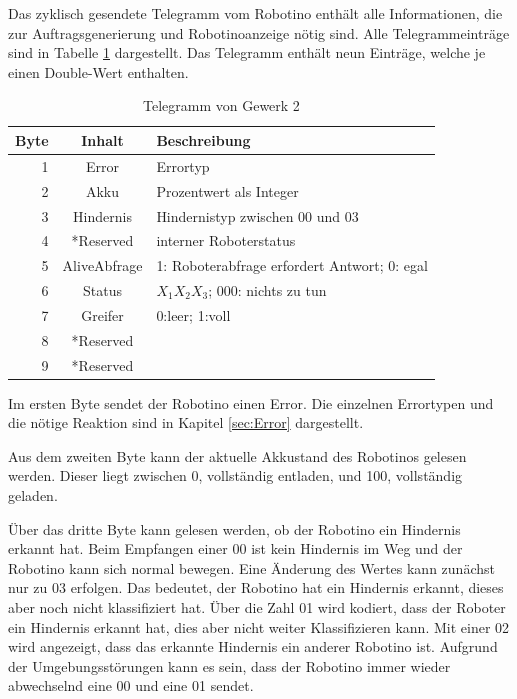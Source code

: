 Das zyklisch gesendete Telegramm vom Robotino enthält alle Informationen, die zur Auftragsgenerierung und Robotinoanzeige nötig sind. Alle Telegrammeinträge sind in Tabelle \ref{tab:TelegrammVonG2} dargestellt. Das Telegramm enthält neun Einträge, welche je einen Double-Wert enthalten. 

\begin{table}[!ht]
	\centering
	\begin{tabular}{|r|c|l|}
		\hline
		Byte & Inhalt	&	Beschreibung \\
		\hline
			1  & Error &  Errortyp  \\
			2  & Akku  & Prozentwert als Integer \\
			3  & Hindernis & Hindernistyp zwischen 00 und 03\\
		  4  & *Reserved &  interner Roboterstatus \\
		  5  & AliveAbfrage  & 1: Roboterabfrage erfordert Antwort; 0: egal \\
		  6  & Status & $X_1X_2X_3$; 000: nichts zu tun \\
		  7  & Greifer   & 0:leer; 1:voll \\
		  8  & *Reserved &  \\
		  9  & *Reserved   &  \\
		\hline
	\end{tabular}
	\caption{Telegramm von Gewerk 2}
	\label{tab:TelegrammVonG2}
\end{table}

Im ersten Byte sendet der Robotino einen Error. Die einzelnen Errortypen und die nötige Reaktion sind in Kapitel \ref{sec:Error} dargestellt. 

Aus dem zweiten Byte kann der aktuelle Akkustand des Robotinos gelesen werden. Dieser liegt zwischen 0, vollständig entladen, und 100, vollständig geladen. 

Über das dritte Byte kann gelesen werden, ob der Robotino ein Hindernis erkannt hat. Beim Empfangen einer 00 ist kein Hindernis im Weg und der Robotino kann sich normal bewegen. Eine Änderung des Wertes kann zunächst nur zu 03 erfolgen. Das bedeutet, der Robotino hat ein Hindernis erkannt, dieses aber noch nicht klassifiziert hat. Über die Zahl 01 wird kodiert, dass der Roboter ein Hindernis erkannt hat, dies aber nicht weiter Klassifizieren kann. Mit einer 02 wird angezeigt, dass das erkannte Hindernis ein anderer Robotino ist. Aufgrund der Umgebungsstörungen kann es sein, dass der Robotino immer wieder abwechselnd eine 00 und eine 01 sendet. 

